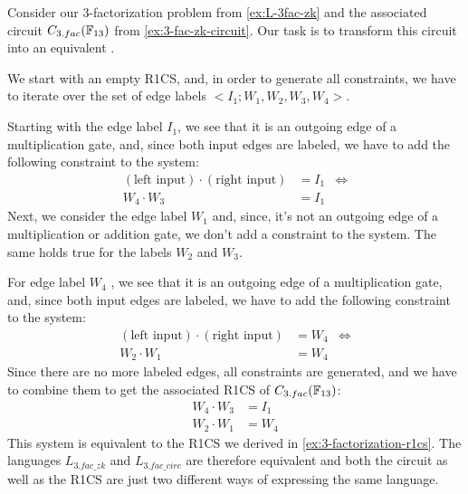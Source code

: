 \begin{example}[$3$-factorization] Consider our $3$-factorization problem from \examplename{} \ref{ex:L-3fac-zk} and the associated circuit $C_{3.fac}(\mathbb{F}_{13})$ from \examplename{} \ref{ex:3-fac-zk-circuit}. Our task is to transform this circuit into an equivalent .
\begin{center}
\end{center}
We start with an empty R1CS, and, in order to generate all constraints, we have to iterate over the set of edge labels $<I_1;W_1,W_2,W_3,W_4>$.  

Starting with the edge label $I_1$, we see that it is an outgoing edge of a multiplication gate, and, since both input edges are labeled, we  have to add the following constraint to the system:
\begin{align*}
(\text{left input})\cdot (\text{right input})  &= I_1 & \Leftrightarrow\\
W_4\cdot W_3  &= I_1
\end{align*}
Next, we consider the edge label $W_1$ and, since, it's not an outgoing edge of a multiplication or addition gate, we don't add a constraint to the system. The same holds true for the labels $W_2$ and $W_3$. 

For edge label $W_4$ , we see that it is an outgoing edge of a multiplication gate, and, since both input edges are labeled, we have to add the following constraint to the system:
\begin{align*}
(\text{left input})\cdot (\text{right input})  &= W_4 & \Leftrightarrow\\
W_2\cdot W_1  &= W_4
\end{align*} 
Since there are no more labeled edges, all constraints are generated, and we have to combine them to get the associated R1CS of $C_{3.fac}(\mathbb{F}_{13})$: 
\begin{align*}
 W_4\cdot W_3 & = I_1\\
 W_2\cdot W_1 & = W_4
\end{align*}
This system is equivalent to the R1CS we derived in \examplename{} \ref{ex:3-factorization-r1cs}. The languages $L_{3.fac\_zk}$ and $L_{3.fac\_circ}$ are therefore equivalent and both the circuit as well as the R1CS are just two different ways of expressing the same language.
\end{example}
